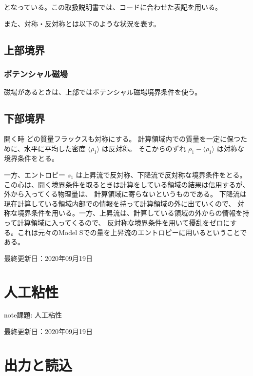 \documentclass[letterpaper,10pt,dvipdfmx,report]{sphinxmanual}
\let\sphinxpxdimen\pdfpxdimen\else\newdimen\sphinxpxdimen
\begin{document}
となっている。この取扱説明書では、コードに合わせた表記を用いる。

また、対称・反対称とは以下のような状況を表す。

\noindent\sphinxincludegraphics[width=450\sphinxpxdimen]{{bc_sym}.png}


\section{上部境界}
\label{\detokenize{boundary:id2}}

\subsection{ポテンシャル磁場}
\label{\detokenize{boundary:id3}}
磁場があるときは、上部ではポテンシャル磁場境界条件を使う。


\section{下部境界}
\label{\detokenize{boundary:id4}}
開く時
どの質量フラックスも対称にする。 計算領域内での質量を一定に保つために、水平に平均した密度
\(\langle \rho_1\rangle\) は反対称。 そこからのずれ
\(\rho_1 - \langle \rho_1 \rangle\) は対称な境界条件をとる。

一方、エントロピー \(s_1\) は上昇流で反対称、下降流で反対称な境界条件をとる。
この心は、開く境界条件を取るときは計算をしている領域の結果は信用するが、外から入ってくる物理量は、
計算領域に寄らないというものである。 下降流は現在計算している領域内部での情報を持って計算領域の外に出ていくので、
対称な境界条件を用いる。一方、上昇流は、計算している領域の外からの情報を持って計算領域に入ってくるので、
反対称な境界条件を用いて擾乱をゼロにする。これは元々のModel Sでの量を上昇流のエントロピーに用いるということである。

最終更新日：2020年09月19日


\chapter{人工粘性}
\label{\detokenize{artdif:id1}}\label{\detokenize{artdif::doc}}
\begin{sphinxadmonition}{note}{\label{\detokenize{artdif:id2}}課題:}
人工粘性
\end{sphinxadmonition}

最終更新日：2020年09月19日


\chapter{出力と読込}
\label{\detokenize{io:id1}}\label{\detokenize{io::doc}}
\end{document}
